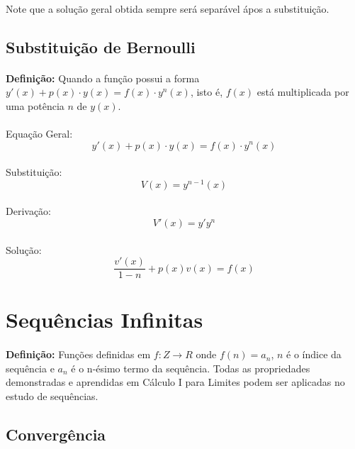 \documentclass{article}
\begin{document}
        \paragraph{}Note que a solução geral obtida sempre será separável ápos a substituição.
    
    \subsection{Substituição de Bernoulli}
        \paragraph{}\textbf{Definição:} Quando a função possui a forma $y'(x)+p(x) \cdot y(x)=f(x) \cdot y^{n}(x)$, isto 
        é, $f(x)$ está multiplicada por uma potência $n$ de $y(x)$.
        \paragraph{}Equação Geral:
            \[y'(x)+p(x) \cdot y(x)=f(x) \cdot y^{n}(x)\]
        \paragraph{}Substituição:
            \[V(x)=y^{n-1}(x)\]
        \paragraph{}Derivação:
            \[V'(x)=y'y^{n}\]
        \paragraph{}Solução:
            \[\frac{v'(x)}{1-n}+p(x)v(x)=f(x)\]
\newpage

\section{Sequências Infinitas}
    \paragraph{}\textbf{Definição:} Funções definidas em $f:Z\to R$ onde $f(n)=a_{n}$, $n$ é o índice da sequência e $a_{n}$ é o n-ésimo termo da sequência. Todas as propriedades demonstradas e aprendidas em Cálculo I para Limites podem ser aplicadas no estudo de sequências. 
    
    \subsection{Convergência}
\end{document}
